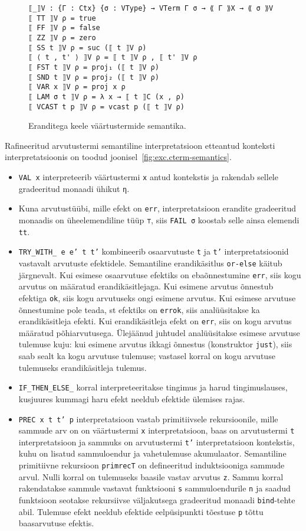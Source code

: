 \documentclass[a4paper,12pt]{article}
\begin{document}
\begin{figure}
  \begin{BVerbatim}
⟦_⟧V : {Γ : Ctx} {σ : VType} → VTerm Γ σ → ⟪ Γ ⟫X → ⟪ σ ⟫V
⟦ TT ⟧V ρ = true
⟦ FF ⟧V ρ = false
⟦ ZZ ⟧V ρ = zero
⟦ SS t ⟧V ρ = suc (⟦ t ⟧V ρ)
⟦ ⟨ t , t' ⟩ ⟧V ρ = ⟦ t ⟧V ρ , ⟦ t' ⟧V ρ
⟦ FST t ⟧V ρ = proj₁ (⟦ t ⟧V ρ)
⟦ SND t ⟧V ρ = proj₂ (⟦ t ⟧V ρ)
⟦ VAR x ⟧V ρ = proj x ρ
⟦ LAM σ t ⟧V ρ = λ x → ⟦ t ⟧C (x , ρ)
⟦ VCAST t p ⟧V ρ = vcast p (⟦ t ⟧V ρ)
  \end{BVerbatim}
  \caption{Eranditega keele väärtustermide semantika.}
  \label{fig:exc.vterm-semantics}
\end{figure}

Rafineeritud arvutustermi semantiline interpretatsioon etteantud konteksti interpretatsioonis on toodud joonisel~\ref{fig:exc.cterm-semantics}.
\begin{itemize}
\item {\tt VAL x} interpreteerib väärtustermi {\tt x} antud kontekstis ja rakendab sellele gradeeritud monaadi ühikut {\tt η}.
\item Kuna arvutustüübi, mille efekt on {\tt err}, interpretatsioon erandite gradeeritud monaadis on üheelemendiline tüüp {\tt ⊤}, siis {\tt FAIL σ} koostab selle ainsa elemendi {\tt tt}.
\item {\tt TRY_WITH_ {e} {e'} t t'} kombineerib osaarvutuste {\tt t} ja {\tt t'} interpretatsioonid vastavalt arvutuste efektidele. Semantiline erandikäsitlus {\tt or-else} käitub järgnevalt. Kui esimese osaarvutuse efektiks on ebaõnnestumine {\tt err}, siis kogu arvutus on määratud erandikäsitlejaga. Kui esimene arvutus õnnestub efektiga {\tt ok}, siis kogu arvutuseks ongi esimene arvutus. Kui esimese arvutuse õnnestumine pole teada, st efektiks on {\tt errok}, siis analüüsitakse ka erandikäsitleja efekti. Kui erandikäsitleja efekt on {\tt err}, siis on kogu arvutus määratud põhiarvutusega. Ülejäänud juhtudel analüüsitakse esimese arvutuse tulemuse kuju: kui esimene arvutus ikkagi õnnestus (konstruktor {\tt just}), siis saab sealt ka kogu arvutuse tulemuse; vastasel korral on kogu arvutuse tulemuseks erandikäsitleja tulemus.
\item {\tt IF_THEN_ELSE_} korral interpreteeritakse tingimus ja harud tingimuslauses, kusjuures kummagi haru efekt neeldub efektide ülemises rajas.
\item {\tt PREC x t t' p} interpretatsioon vastab primitiivsele rekursioonile, mille sammude arv on on väärtustermi {\tt x} interpretatsioon, baas on arvutustermi {\tt t} interpretatsioon ja sammuks on arvutustermi {\tt t'} interpretatsioon kontekstis, kuhu on lisatud sammuloendur ja vahetulemuse akumulaator. Semantiline primitiivne rekursioon {\tt primrecT} on defineeritud induktsiooniga sammude arvul. Nulli korral on tulemuseks baasile vastav arvutus {\tt z}. Sammu korral rakendatakse sammule vastavat funktsiooni {\tt s} sammuloendurile {\tt n} ja saadud funktsioon seotakse rekursiivse väljakutsega gradeeritud monaadi {\tt bind}-tehte abil. Tulemuse efekt neeldub efektide eelpüsipunkti tõestuse {\tt p} tõttu baasarvutuse efektis.

\end{itemize}
\end{document}
